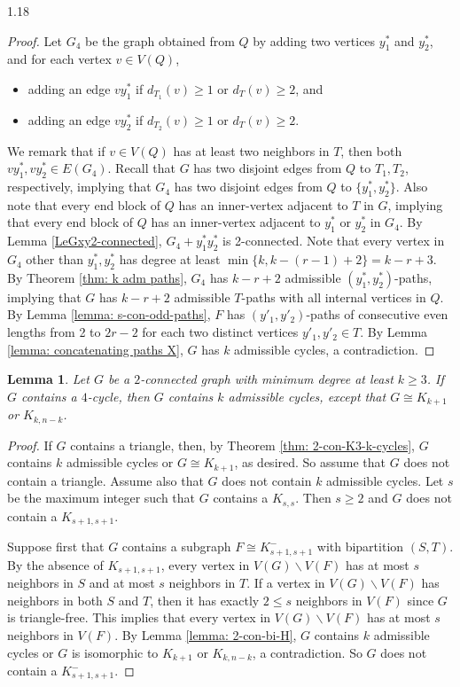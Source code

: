 \documentclass[10pt]{article}
\newtheorem{lemma}[theorem]{Lemma}
\let\geq\geqslant
\begin{document}
\begin{spacing}{1.18}
\begin{proof}
    Let $G_4$ be the graph obtained from $Q$ by adding two vertices $y_1^*$ and $y_2^*$, and for each vertex $v\in V(Q)$, 
    \begin{itemize}
	    \item[(1)] adding an edge $vy_1^*$ if $d_{T_1}(v)\geq 1$ or $d_T(v)\geq 2$, and
        \item[(2)] adding an edge $vy_2^*$ if $d_{T_2}(v)\geq 1$ or $d_T(v)\geq 2$.
    \end{itemize}
    We remark that if $v\in V(Q)$ has at least two neighbors in $T$, then both $vy_1^*,vy_2^*\in E(G_4)$. Recall that $G$ has two disjoint edges from $Q$ to $T_1,T_2$, respectively, implying that $G_4$ has two disjoint edges from $Q$ to $\{y_1^*,y_2^*\}$. Also note that every end block of $Q$ has an inner-vertex adjacent to $T$ in $G$, implying that every end block of $Q$ has an inner-vertex adjacent to $y_1^*$ or $y_2^*$ in $G_4$. By Lemma \ref{LeGxy2-connected}, $G_4+y_1^*y_2^*$ is 2-connected. Note that every vertex in $G_4$ other than $y_1^*,y_2^*$ has degree at least $\min\{k,k-(r-1)+2\}=k-r+3$. By Theorem \ref{thm: k adm paths}, $G_4$ has $k-r+2$ admissible $(y_1^*,y_2^*)$-paths, implying that $G$ has $k-r+2$ admissible $T$-paths with all internal vertices in $Q$. By Lemma \ref{lemma: s-con-odd-paths}, $F$ has $(y'_1,y'_2)$-paths of consecutive even lengths from 2 to $2r-2$ for each two distinct vertices $y'_1,y'_2\in T$. By Lemma \ref{lemma: concatenating paths X}, $G$ has $k$ admissible cycles, a contradiction. 
\end{proof}   



\begin{lemma}\label{lemma: 3-con-grith4}
    Let $G$ be a $2$-connected graph with minimum degree at least $k\geqslant 3$. If $G$ contains a $4$-cycle, then $G$ contains $k$ admissible cycles, except that $G\cong K_{k+1}$ or $K_{k,n-k}$.
\end{lemma}

\begin{proof}
    If $G$ contains a triangle, then, by Theorem \ref{thm: 2-con-K3-k-cycles}, $G$ contains $k$ admissible cycles or $G\cong K_{k+1}$, as desired. So assume that $G$ does not contain a triangle. Assume also that $G$ does not contain $k$ admissible cycles. Let $s$ be the maximum integer such that $G$ contains a $K_{s,s}$. Then $s\geqslant 2$ and $G$ does not contain a $K_{s+1,s+1}$. 
    
    Suppose first that $G$ contains a subgraph $F \cong K_{s+1,s+1}^-$ with bipartition $(S,T)$. By the absence of $K_{s+1,s+1}$, every vertex in $V(G)\backslash V(F)$ has at most $s$ neighbors in $S$ and at most $s$ neighbors in $T$. If a vertex in $V(G)\backslash V(F)$ has neighbors in both $S$ and $T$, then it has exactly $2\leqslant s$ neighbors in $V(F)$ since $G$ is triangle-free. This implies that every vertex in $V(G)\backslash V(F)$ has at most $s$ neighbors in $V(F)$. By Lemma \ref{lemma: 2-con-bi-H}, $G$ contains $k$ admissible cycles or $G$ is isomorphic to $K_{k+1}$ or $K_{k,n-k}$, a contradiction. So $G$ does not contain a $K_{s+1,s+1}^-$. 
    

\end{proof}
\end{spacing}
\end{document}
